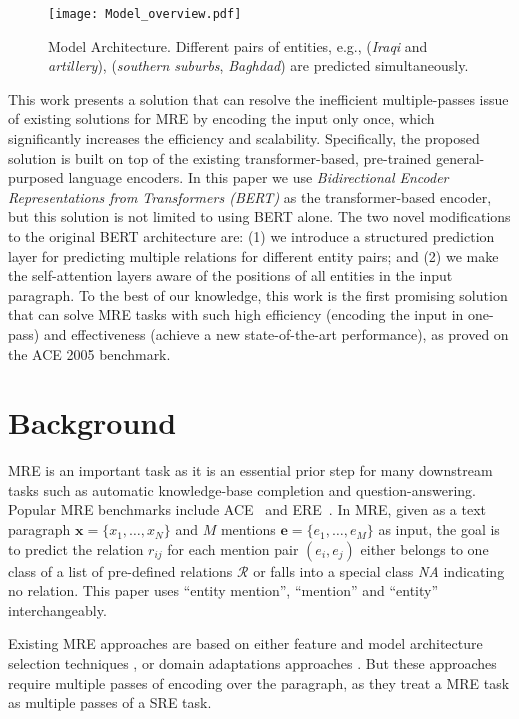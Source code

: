 \documentclass[11pt,a4paper]{article}
\begin{document}
\begin{figure}[t!]
\vspace{-2mm}
  \texttt{[image: Model\_overview.pdf]}
  \caption{\small Model Architecture.  Different pairs of entities, e.g., (\emph{Iraqi} and \emph{artillery}), (\emph{southern suburbs}, \emph{Baghdad}) are predicted simultaneously.
}
  \label{fig:model-overview}
  \vspace{-3mm}
\end{figure}

This work presents a solution that can resolve the inefficient multiple-passes issue of existing solutions for MRE by encoding the input only once, which significantly increases the efficiency and scalability. Specifically, the proposed solution is built on top of the existing transformer-based, pre-trained general-purposed language encoders. In this paper we use \emph{Bidirectional Encoder Representations from Transformers (BERT)} \cite{devlin2018bert} as the transformer-based encoder, but this solution is not limited to using BERT alone. The two novel modifications to the original BERT architecture are: (1) we introduce a structured prediction layer for predicting multiple relations for different entity pairs; and (2) we make the self-attention layers aware of the positions of all entities in the input paragraph. To the best of our knowledge, this work is the first promising solution that can solve MRE tasks with such high efficiency (encoding the input in one-pass) and effectiveness (achieve a new state-of-the-art performance), as proved on the ACE 2005 benchmark.  

\section{Background}
MRE is an important task as it is an essential prior step for many downstream tasks such as automatic knowledge-base completion and question-answering. 
Popular MRE benchmarks  
include ACE~\cite{walker2006ace} and ERE~\cite{ldc2013ere}.   In MRE, given as a text paragraph  $\mathbf{x}=\{x_1, \dots, x_N\}$ and $M$ mentions $\mathbf{e}=\{e_1, \dots, e_M\}$ as input, the goal is to predict the relation $r_{ij}$ for each mention pair $(e_i, e_j)$ either belongs to one class of a list of pre-defined relations $\mathcal{R}$ or falls into a special class \emph{NA} indicating no relation.  
This paper uses ``entity mention'', ``mention'' and ``entity'' interchangeably.  

Existing MRE approaches are based on either feature and model architecture selection techniques \cite{xu2015semantic,gormley2015improved, nguyen2015combining,petroni2015core,TUD-CS-2017-0119,song2018n}, or domain adaptations approaches \cite{fu2017domain,shi2018genre}. But these approaches require multiple passes of encoding over the paragraph, as they treat a MRE task as multiple passes of a SRE task.
\end{document}
